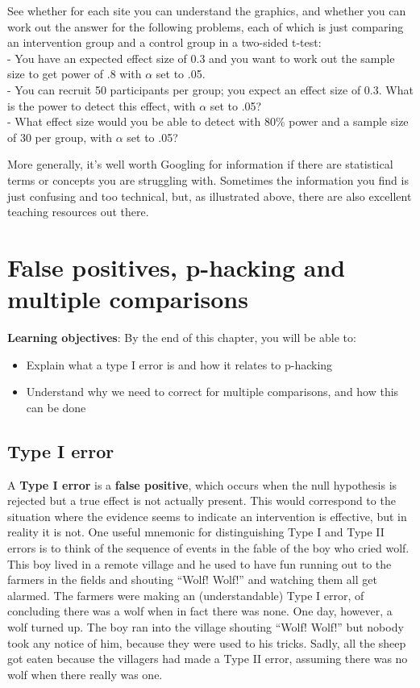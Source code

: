 \documentclass{krantz}
\begin{document}
See whether for each site you can understand the graphics, and whether you can work out the answer for the following problems, each of which is just comparing an intervention group and a control group in a two-sided t-test:\\
- You have an expected effect size of 0.3 and you want to work out the sample size to get power of .8 with \(\alpha\) set to .05.\\
- You can recruit 50 participants per group; you expect an effect size of 0.3. What is the power to detect this effect, with \(\alpha\) set to .05?\\
- What effect size would you be able to detect with 80\% power and a sample size of 30 per group, with \(\alpha\) set to .05?

More generally, it's well worth Googling for information if there are statistical terms or concepts you are struggling with. Sometimes the information you find is just confusing and too technical, but, as illustrated above, there are also excellent teaching resources out there.

\hypertarget{phacking}{%
\chapter{False positives, p-hacking and multiple comparisons}\label{phacking}}

\textbf{Learning objectives}: By the end of this chapter, you will be able to:

\begin{itemize}
\item
  Explain what a type I error is and how it relates to p-hacking
\item
  Understand why we need to correct for multiple comparisons, and how this can be done
\end{itemize}

\hypertarget{type-i-error}{%
\section{Type I error}\label{type-i-error}}

A \textbf{Type I error} is a \textbf{false positive}, which occurs when the null hypothesis is rejected but a true effect is not actually present. This would correspond to the situation where the evidence seems to indicate an intervention is effective, but in reality it is not. One useful mnemonic for distinguishing Type I and Type II errors is to think of the sequence of events in the fable of the boy who cried wolf. This boy lived in a remote village and he used to have fun running out to the farmers in the fields and shouting ``Wolf! Wolf!'' and watching them all get alarmed. The farmers were making an (understandable) Type I error, of concluding there was a wolf when in fact there was none. One day, however, a wolf turned up. The boy ran into the village shouting ``Wolf! Wolf!'' but nobody took any notice of him, because they were used to his tricks. Sadly, all the sheep got eaten because the villagers had made a Type II error, assuming there was no wolf when there really was one.\\
\end{document}
